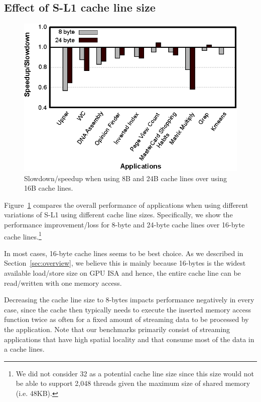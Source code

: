 \subsection{Effect of S-L1 cache line size}
\label{sec:cachelineeffect}


\begin{figure}[t]
\center
\includegraphics[scale=0.85]{6differentCachelineSizes.eps}
\vspace{-0.4cm}
\caption{\footnotesize\textnormal{Slowdown/speedup when using 8B and 24B cache lines over using 16B cache lines.}}
\label{fig:cachelinesize}
\vspace{-0.4cm}
\end{figure}

Figure~\ref{fig:cachelinesize} compares the overall performance of applications when using different variations of S-L1 using different cache line sizes. 
Specifically, we show the performance improvement/loss for 8-byte and 24-byte cache lines over
16-byte cache lines.\footnote{We did not consider 32 as a potential cache line size since 
    this size would not be able to support 2,048 threads given the maximum size of shared memory  
    (i.e. 48KB).}

In most cases, 16-byte cache lines seems to be best choice. 
As we described in Section~\ref{sec:overview}, we believe this is mainly because 16-bytes is the widest available load/store size on GPU ISA and hence, the entire cache line can be read/written with one memory access.

Decreasing the cache line size to 8-bytes impacts performance negatively in every case, since the cache then typically needs to execute the inserted memory access function twice as often for a fixed amount of streaming data to be processed by the application. 
Note that our benchmarks primarily consist of streaming applications that have high spatial locality and that consume most of the data in a cache lines.

